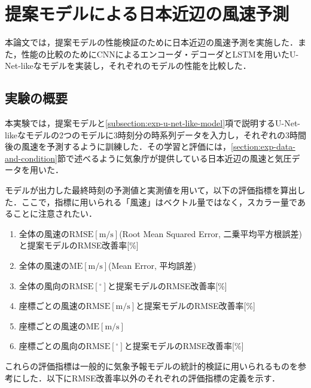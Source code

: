\chapter{提案モデルによる日本近辺の風速予測\label{chap:experiments}}
本論文では，提案モデルの性能検証のために日本近辺の風速予測を実施した．また，性能の比較のためにCNNによるエンコーダ・デコーダとLSTMを用いたU-Net-likeなモデルを実装し，それぞれのモデルの性能を比較した．

\section{実験の概要 \label{section:exp-overview}}
本実験では，提案モデルと\ref{subsection:exp-u-net-like-model}項で説明するU-Net-likeなモデルの2つのモデルに3時刻分の時系列データを入力し，それぞれの3時間後の風速を予測するように訓練した．その学習と評価には，\ref{section:exp-data-and-condition}節で述べるように気象庁が提供している日本近辺の風速と気圧データを用いた．

モデルが出力した最終時刻の予測値と実測値を用いて，以下の評価指標を算出した．ここで，指標に用いられる「風速」はベクトル量ではなく，スカラー量であることに注意されたい．
% 
\begin{enumerate}
  \item 全体の風速の$\mathrm{RMSE[m/s]}$(Root Mean Squared Error, 二乗平均平方根誤差)と提案モデルのRMSE改善率[\%]
  \item 全体の風速の$\mathrm{ME[m/s]}$(Mean Error, 平均誤差)
  \item 全体の風向の$\mathrm{RMSE[^\circ]}$と提案モデルのRMSE改善率[\%]
  \item 座標ごとの風速の$\mathrm{RMSE[m/s]}$と提案モデルのRMSE改善率[\%]
  \item 座標ごとの風速の$\mathrm{ME[m/s]}$
  \item 座標ごとの風向の$\mathrm{RMSE[^\circ]}$と提案モデルのRMSE改善率[\%]
\end{enumerate}
これらの評価指標は一般的に気象予報モデルの統計的検証に用いられるものを参考にした\cite{Kishochou2018}．以下にRMSE改善率以外のそれぞれの評価指標の定義を示す．

